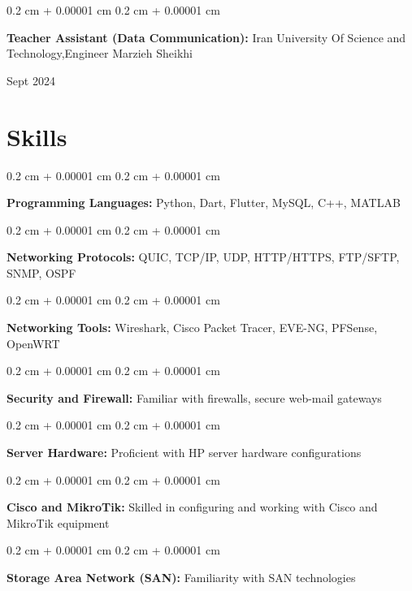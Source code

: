 \documentclass[10pt, letterpaper]{article}
\newenvironment{onecolentry}{
	\begin{adjustwidth}{
			0.2 cm + 0.00001 cm
		}{
			0.2 cm + 0.00001 cm
		}
	}{
	\end{adjustwidth}
} %
\newenvironment{twocolentry}[2][]{
	\onecolentry
	\def\secondColumn{#2}
	\setcolumnwidth{\fill, 4.5 cm}
	\begin{paracol}{2}
	}{
		\switchcolumn \raggedleft \secondColumn
	\end{paracol}
	\endonecolentry
} %
\begin{document}
	\vspace{0.2 cm}	
	
	\begin{twocolentry}{Sept 2024}
	\textbf{Teacher Assistant (Data Communication):} Iran University Of Science and
	Technology,Engineer Marzieh Sheikhi
	\end{twocolentry}

\section{Skills}
\vspace{0.2 cm} %
\begin{onecolentry}
	\textbf{Programming Languages:} Python, Dart, Flutter, MySQL, C++, MATLAB
\end{onecolentry}

\vspace{0.2 cm}
\begin{onecolentry}
	\textbf{Networking Protocols:} QUIC, TCP/IP, UDP, HTTP/HTTPS, FTP/SFTP, SNMP, OSPF
\end{onecolentry}

\vspace{0.2 cm}
\begin{onecolentry}
	\textbf{Networking Tools:} Wireshark, Cisco Packet Tracer, EVE-NG, PFSense, OpenWRT
\end{onecolentry}

\vspace{0.2 cm}
\begin{onecolentry}
	\textbf{Security and Firewall:} Familiar with firewalls, secure web-mail gateways
\end{onecolentry}

\vspace{0.2 cm}
\begin{onecolentry}
	\textbf{Server Hardware:} Proficient with HP server hardware configurations
\end{onecolentry}

\vspace{0.2 cm}
\begin{onecolentry}
	\textbf{Cisco and MikroTik:} Skilled in configuring and working with Cisco and MikroTik equipment
\end{onecolentry}

\vspace{0.2 cm}
\begin{onecolentry}
	\textbf{Storage Area Network (SAN):} Familiarity with SAN technologies
\end{onecolentry}
\end{document}
